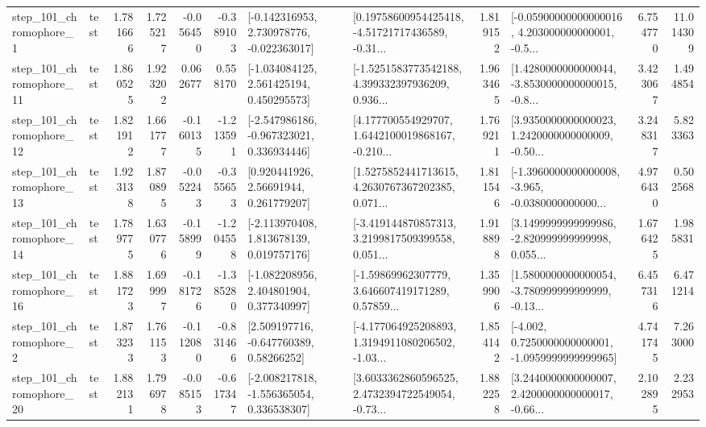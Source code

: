 \begin{tabular}{llrrrrllrlrr}
   step\_101\_chromophore\_1 &      test &      1.781666 &    1.725217 &     -0.056450 & -0.389103 &   [-0.142316953, 2.730978776, -0.022363017] &  [0.19758600954425418, -4.51721717436589, -0.31... &       1.819152 &  [-0.05900000000000016, 4.203000000000001, -0.5... &            6.754770 &         11.014309 \\
  step\_101\_chromophore\_11 &      test &      1.860525 &    1.923202 &      0.062677 &  0.558170 &    [-1.034084125, 2.561425194, 0.450295573] &  [-1.5251583773542188, 4.399332397936209, 0.936... &       1.963465 &  [1.4280000000000044, -3.8530000000000015, -0.8... &            3.423067 &          1.494854 \\
  step\_101\_chromophore\_12 &      test &      1.821912 &    1.661777 &     -0.160135 & -1.213591 &   [-2.547986186, -0.967323021, 0.336934446] &  [4.177700554929707, 1.6442100019868167, -0.210... &       1.769211 &  [3.9350000000000023, 1.2420000000000009, -0.50... &            3.248317 &          5.823363 \\
  step\_101\_chromophore\_13 &      test &      1.923138 &    1.870895 &     -0.052243 & -0.355653 &      [0.920441926, 2.56691944, 0.261779207] &  [1.5275852441713615, 4.2630767367202385, 0.071... &       1.811546 &  [-1.3960000000000008, -3.965, -0.0380000000000... &            4.976430 &          0.502568 \\
  step\_101\_chromophore\_14 &      test &      1.789775 &    1.630776 &     -0.158999 & -1.204558 &    [-2.113970408, 1.813678139, 0.019757176] &  [-3.419144870857313, 3.2199817509399558, 0.051... &       1.918898 &  [3.1499999999999986, -2.820999999999998, 0.055... &            1.676425 &          1.985831 \\
  step\_101\_chromophore\_16 &      test &      1.881723 &    1.699997 &     -0.181726 & -1.385280 &    [-1.082208956, 2.404801904, 0.377340997] &  [-1.59869962307779, 3.646607419171289, 0.57859... &       1.359906 &  [1.5800000000000054, -3.780999999999999, -0.13... &            6.457316 &          6.471214 \\
   step\_101\_chromophore\_2 &      test &      1.873233 &    1.761153 &     -0.112080 & -0.831466 &     [2.509197716, -0.647760389, 0.58266252] &  [-4.177064925208893, 1.3194911080206502, -1.03... &       1.854142 &  [-4.002, 0.7250000000000001, -1.0959999999999965] &            4.741745 &          7.263000 \\
  step\_101\_chromophore\_20 &      test &      1.882131 &    1.796978 &     -0.085153 & -0.617347 &   [-2.008217818, -1.556365054, 0.336538307] &  [3.6033362860596525, 2.4732394722549054, -0.73... &       1.882258 &  [3.2440000000000007, 2.4200000000000017, -0.66... &            2.102895 &          2.232953 \\

\end{tabular}
